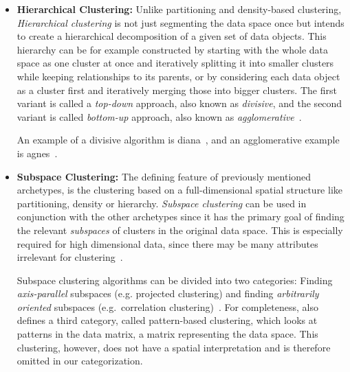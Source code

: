 \begin{itemize}
    \item \textbf{Hierarchical Clustering:} Unlike partitioning and density-based clustering, \textit{Hierarchical clustering} is not just segmenting the data space once but intends to create a hierarchical decomposition of a given set of data objects. This hierarchy can be for example constructed by starting with the whole data space as one cluster at once and iteratively splitting it into smaller clusters while keeping relationships to its parents, or by considering each data object as a cluster first and iteratively merging those into bigger clusters. The first variant is called a \textit{top-down} approach, also known as \textit{divisive}, and the second variant is called \textit{bottom-up} approach, also known as \textit{agglomerative}~\cite[Ch.10.3]{han2011data}. 
    
    An example of a divisive algorithm is \acrshort{diana}~\cite[Ch.6]{kaufman2009finding}, and an agglomerative example is \acrshort{agnes}~\cite[Ch.5]{kaufman2009finding}.
    
    
    \item \textbf{Subspace Clustering:} The defining feature of previously mentioned archetypes, is the clustering based on a full-dimensional spatial structure like partitioning, density or hierarchy. \textit{Subspace clustering} can be used in conjunction with the other archetypes since it has the primary goal of finding the relevant \textit{subspaces} of clusters in the original data space. This is especially required for high dimensional data, since there may be many attributes irrelevant for clustering~\cite{vidal2011subspace}. 
    
    Subspace clustering algorithms can be divided into two categories: Finding \textit{axis-parallel} subspaces (e.g. projected clustering) and finding \textit{arbitrarily oriented} subspaces (e.g.\ correlation clustering)~\cite[Ch.3]{zimek2009correlation}.
    For completeness, \textcite{zimek2009correlation} also defines a third category, called pattern-based clustering, which looks at patterns in the data matrix, a matrix representing the data space. This clustering, however, does not have a spatial interpretation and is therefore omitted in our categorization.
    

\end{itemize}
